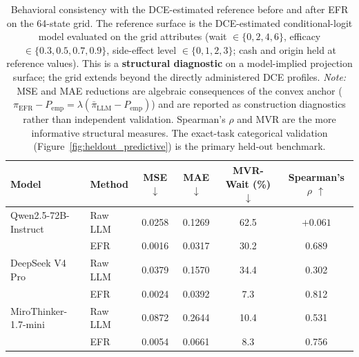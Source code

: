 \documentclass[12pt]{article}
\begin{document}
\begin{table}[!htbp]
\centering
\caption{Behavioral consistency with the DCE-estimated reference before and after EFR on the 64-state grid. The reference surface is the DCE-estimated conditional-logit model evaluated on the grid attributes (wait $\in \{0,2,4,6\}$, efficacy $\in \{0.3,0.5,0.7,0.9\}$, side-effect level $\in \{0,1,2,3\}$; cash and origin held at reference values). This is a \textbf{structural diagnostic} on a model-implied projection surface; the grid extends beyond the directly administered DCE profiles. \textit{Note:} MSE and MAE reductions are algebraic consequences of the convex anchor ($\pi_{\mathrm{EFR}} - P_{\mathrm{emp}} = \lambda(\bar\pi_{\mathrm{LLM}} - P_{\mathrm{emp}})$) and are reported as construction diagnostics rather than independent validation. Spearman's $\rho$ and MVR are the more informative structural measures. The exact-task categorical validation (Figure~\ref{fig:heldout_predictive}) is the primary held-out benchmark.}
\label{tab:behavioral_alignment}

\begin{tabular}{llcccc}
\toprule
Model & Method & MSE $\downarrow$ & MAE $\downarrow$ & MVR-Wait (\%) $\downarrow$ & Spearman's $\rho$ $\uparrow$\\
\midrule

Qwen2.5-72B-Instruct
& Raw LLM
& 0.0258
& 0.1269
& 62.5
& $+0.061$ \\

& EFR
& 0.0016
& 0.0317
& 30.2
& 0.689 \\

\addlinespace

DeepSeek V4 Pro
& Raw LLM
& 0.0379
& 0.1570
& 34.4
& 0.302 \\

& EFR
& 0.0024
& 0.0392
& 7.3
& 0.812 \\

\addlinespace

MiroThinker-1.7-mini
& Raw LLM
& 0.0872
& 0.2644
& 10.4
& 0.531 \\

& EFR
& 0.0054
& 0.0661
& 8.3
& 0.756 \\

\bottomrule
\end{tabular}
\end{table}
\end{document}
